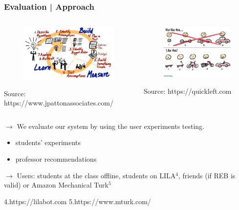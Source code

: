 \documentclass{beamer}
\begin{document}
\begin{frame}
\frametitle{Evaluation | Approach }


\begin{columns}[onlytextwidth]
	\begin{column}{.45\textwidth}
		\begin{figure}
			\includegraphics[width=\textwidth]{lsm}
		\end{figure}
		{\tiny 	Source: https://www.jpattonassociates.com/}
	\end{column}
	\hfill
	\begin{column}{.45\textwidth}
		\begin{figure}
			\includegraphics[width=.8\textwidth]{mvp}
		\end{figure}
		{\tiny 	Source: https://quickleft.com}
	\end{column}
\end{columns}

{\scriptsize  $\rightarrow$  We evaluate our system by using the user experiments testing. 
	\begin{itemize}
		\item students' experiments
		\item professor recommendations
	\end{itemize}
	$\rightarrow$ Users: students at the class offline, students on LILA$^4$, friends (if REB is valid) or Amazon Mechanical Turk$^5$}

\begin{flushleft}
	
	{\tiny 4.https://lilabot.com             }
	{\tiny 	 5.https://www.mturk.com/}
\end{flushleft}

\end{frame}
\end{document}
